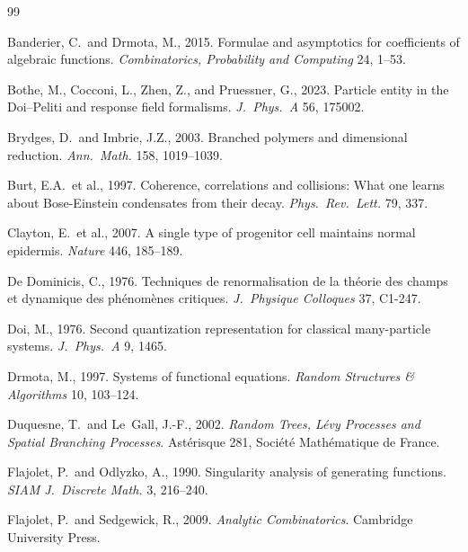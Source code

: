 \documentclass[11pt,a4paper]{article}
\theoremstyle{plain}
\theoremstyle{remark}
\begin{document}
\begin{thebibliography}{99}

Banderier, C.\ and Drmota, M., 2015. Formulae and asymptotics for coefficients of algebraic functions. \textit{Combinatorics, Probability and Computing} 24, 1--53.

Bothe, M., Cocconi, L., Zhen, Z., and Pruessner, G., 2023. Particle entity in the Doi--Peliti and response field formalisms. \textit{J.\ Phys.\ A} 56, 175002.

Brydges, D.\ and Imbrie, J.Z., 2003. Branched polymers and dimensional reduction. \textit{Ann.\ Math.} 158, 1019--1039.

Burt, E.A.\ et al., 1997. Coherence, correlations and collisions: What one learns about Bose-Einstein condensates from their decay. \textit{Phys.\ Rev.\ Lett.} 79, 337.

Clayton, E.\ et al., 2007. A single type of progenitor cell maintains normal epidermis. \textit{Nature} 446, 185--189.

De Dominicis, C., 1976. Techniques de renormalisation de la théorie des champs et dynamique des phénomènes critiques. \textit{J.\ Physique Colloques} 37, C1-247.

Doi, M., 1976. Second quantization representation for classical many-particle systems. \textit{J.\ Phys.\ A} 9, 1465.

Drmota, M., 1997. Systems of functional equations. \textit{Random Structures \& Algorithms} 10, 103--124.

Duquesne, T.\ and Le~Gall, J.-F., 2002. \textit{Random Trees, Lévy Processes and Spatial Branching Processes}. Astérisque 281, Société Mathématique de France.

Flajolet, P.\ and Odlyzko, A., 1990. Singularity analysis of generating functions. \textit{SIAM J.\ Discrete Math.} 3, 216--240.

Flajolet, P.\ and Sedgewick, R., 2009. \textit{Analytic Combinatorics}. Cambridge University Press.


\end{thebibliography}
\end{document}
